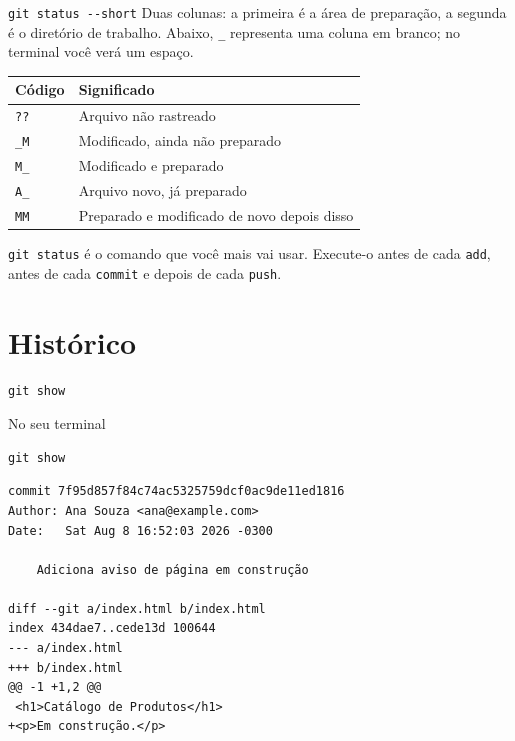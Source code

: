 \documentclass{beamer}
\newcommand{\ddash}{-\mbox{}-}
\newenvironment{noterminal}
  {\begin{exampleblock}{No seu terminal}}
  {\end{exampleblock}}
\begin{document}
\begin{frame}[fragile]{\texttt{git status \ddash short}}
  Duas colunas: a primeira é a área de preparação, a segunda é o diretório de
  trabalho. Abaixo, \texttt{\_} representa uma coluna em branco; no terminal
  você verá um espaço.

  \vspace{0.3cm}
  \begin{center}
    \begin{tabular}{ll}
      \toprule
      \textbf{Código} & \textbf{Significado} \\
      \midrule
      \texttt{??} & Arquivo não rastreado \\
      \texttt{\_M} & Modificado, ainda não preparado \\
      \texttt{M\_} & Modificado e preparado \\
      \texttt{A\_} & Arquivo novo, já preparado \\
      \texttt{MM} & Preparado e modificado de novo depois disso \\
      \bottomrule
    \end{tabular}
  \end{center}

  \vspace{0.3cm}
  \texttt{git status} é o comando que você mais vai usar. Execute-o antes de
  cada \texttt{add}, antes de cada \texttt{commit} e depois de cada
  \texttt{push}.
\end{frame}

\section{Histórico}

\begin{frame}[fragile]{\texttt{git show}}
  \begin{noterminal}
    \begin{verbatim}
git show
    \end{verbatim}
  \end{noterminal}

  \begin{verbatim}
commit 7f95d857f84c74ac5325759dcf0ac9de11ed1816
Author: Ana Souza <ana@example.com>
Date:   Sat Aug 8 16:52:03 2026 -0300

    Adiciona aviso de página em construção

diff --git a/index.html b/index.html
index 434dae7..cede13d 100644
--- a/index.html
+++ b/index.html
@@ -1 +1,2 @@
 <h1>Catálogo de Produtos</h1>
+<p>Em construção.</p>
  \end{verbatim}
\end{frame}
\end{document}
